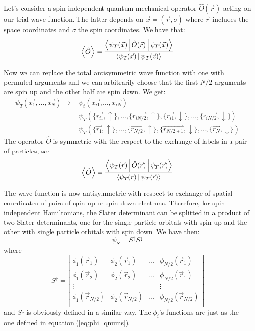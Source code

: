 \documentclass[a4paper,twoside,11pt]{book}
\begin{document}
Let's consider a spin-independent quantum mechanical operator $\hat{O}(\vec{r}) $ acting on our trial wave function. The latter depends on $\vec{x} = (\vec{r}, \sigma) $ where $\vec{r}$ includes the space coordinates and $\sigma$ the spin coordinates.
We have that:
\begin{equation}
	\Braket{\hat{O}} = \frac{\Braket{\psi_T(\vec{x})|\hat{O}(\vec{r})|\psi_T(\vec{x})}}{\Braket{\psi_T(\vec{x})|\psi_T(\vec{x})}}
\end{equation}

Now we can replace the total antisymmetric wave function with one with permuted arguments and we can arbitrarily choose that the first $N/2$ arguments are spin up and the other half are spin down. We get:
\begin{align}
	\psi_T(\vec{x_1},\ldots,\vec{x_N}) 
	\longrightarrow& \, \psi_t(\vec{x_{i1}},\ldots,\vec{x_{iN}}) \\
	=& \, \psi_T(\{\vec{r_{i1}}, \uparrow\},\ldots,\{\vec{r_{iN/2}}, \uparrow\},\{\vec{r_{i1}}, \downarrow\},\ldots,\{\vec{r_{iN/2}}, \downarrow\}) \\
	=& \, \psi_T(\{\vec{r_{1}}, \uparrow\},\ldots,\{\vec{r_{N/2}}, \uparrow\},\{\vec{r_{N/2 +1}}, \downarrow\},\ldots,\{\vec{r_{N}}, \downarrow\})
\end{align}
The operator $\hat{O}$ is symmetric with the respect to the exchange of labels in a pair of particles, so:
\begin{equation}
	\Braket{\hat{O}} = \frac{\Braket{\psi_T(\vec{r})|\hat{O}(\vec{r})|\psi_T(\vec{r})}}{\Braket{\psi_T(\vec{r})|\psi_T(\vec{r})}}
\end{equation}

The wave function is now antisymmetric with respect to exchange of spatial coordinates of pairs of spin-up or spin-down electrons. Therefore, for spin-independent Hamiltonians, the Slater determinant can be splitted in a product of two Slater determinants, one for the single particle orbitals with spin up and the other with single particle orbitals with spin down. We have then:
\begin{equation}
	\psi_S = S^{\uparrow}S^{\downarrow}
\end{equation}
where
\begin{equation}
	S^{\uparrow} = \left|
	\begin{matrix}
		\phi_1(\vec{r}_1) & \phi_2(\vec{r}_1) & \dots & \phi_{N/2}(\vec{r}_1) \\
		\phi_1(\vec{r}_2) & \phi_2(\vec{r}_2) & \dots & \phi_{N/2}(\vec{r}_1) \\
		\vdots &  &  & \vdots \\
		\phi_1(\vec{r}_{N/2}) & \phi_2(\vec{r}_{N/2}) & \dots & \phi_{N/2}(\vec{r}_{N/2}) \\
	\end{matrix}
	\right|
\end{equation}
and  $S^{\downarrow}$ is obviously defined in a similar way. The $\phi_i$'s functions are just as the one defined in equation (\ref{eq:phi_qnums}).
\end{document}
